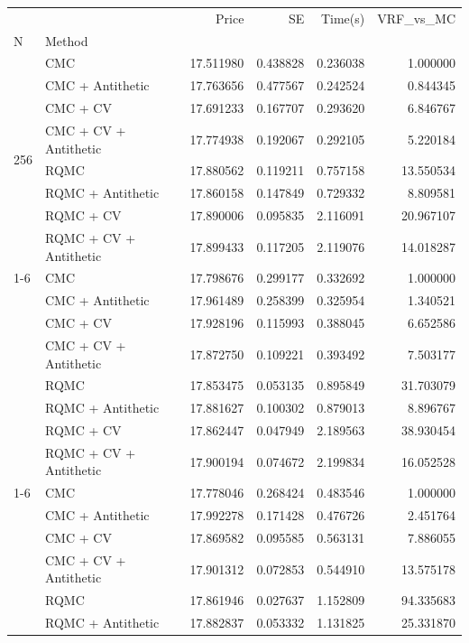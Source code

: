\begin{tabular}{llrrrr}
\toprule
 &  & Price & SE & Time(s) & VRF_vs_MC \\
N & Method &  &  &  &  \\
\midrule
\multirow[t]{8}{*}{256} & CMC & 17.511980 & 0.438828 & 0.236038 & 1.000000 \\
 & CMC + Antithetic & 17.763656 & 0.477567 & 0.242524 & 0.844345 \\
 & CMC + CV & 17.691233 & 0.167707 & 0.293620 & 6.846767 \\
 & CMC + CV + Antithetic & 17.774938 & 0.192067 & 0.292105 & 5.220184 \\
 & RQMC & 17.880562 & 0.119211 & 0.757158 & 13.550534 \\
 & RQMC + Antithetic & 17.860158 & 0.147849 & 0.729332 & 8.809581 \\
 & RQMC + CV & 17.890006 & 0.095835 & 2.116091 & 20.967107 \\
 & RQMC + CV + Antithetic & 17.899433 & 0.117205 & 2.119076 & 14.018287 \\
\cline{1-6}
\multirow[t]{8}{*}{512} & CMC & 17.798676 & 0.299177 & 0.332692 & 1.000000 \\
 & CMC + Antithetic & 17.961489 & 0.258399 & 0.325954 & 1.340521 \\
 & CMC + CV & 17.928196 & 0.115993 & 0.388045 & 6.652586 \\
 & CMC + CV + Antithetic & 17.872750 & 0.109221 & 0.393492 & 7.503177 \\
 & RQMC & 17.853475 & 0.053135 & 0.895849 & 31.703079 \\
 & RQMC + Antithetic & 17.881627 & 0.100302 & 0.879013 & 8.896767 \\
 & RQMC + CV & 17.862447 & 0.047949 & 2.189563 & 38.930454 \\
 & RQMC + CV + Antithetic & 17.900194 & 0.074672 & 2.199834 & 16.052528 \\
\cline{1-6}
\multirow[t]{8}{*}{1024} & CMC & 17.778046 & 0.268424 & 0.483546 & 1.000000 \\
 & CMC + Antithetic & 17.992278 & 0.171428 & 0.476726 & 2.451764 \\
 & CMC + CV & 17.869582 & 0.095585 & 0.563131 & 7.886055 \\
 & CMC + CV + Antithetic & 17.901312 & 0.072853 & 0.544910 & 13.575178 \\
 & RQMC & 17.861946 & 0.027637 & 1.152809 & 94.335683 \\
 & RQMC + Antithetic & 17.882837 & 0.053332 & 1.131825 & 25.331870 \\

\end{tabular}
